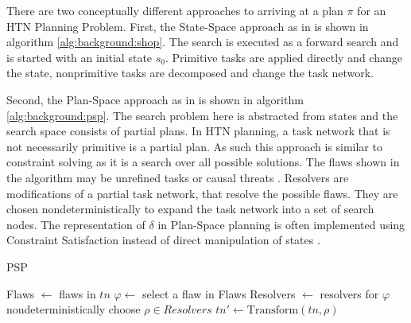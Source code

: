 There are two conceptually different approaches to arriving at a plan $\pi$ for an HTN Planning Problem. 
First, the State-Space approach as in \cite{nauSHOPSimpleHierarchical1999} is shown in algorithm \ref{alg:background:shop}.
The search is executed as a forward search and is started with an initial state $s_0$.
Primitive tasks are applied directly and change the state, nonprimitive tasks are decomposed and change the task network.

Second, the Plan-Space approach as in \citet[chap.~5]{ghallabAutomatedPlanningTheory2004} is shown in algorithm \ref{alg:background:psp}.
The search problem here is abstracted from states and the search space consists of partial plans.
In HTN planning, a task network that is not necessarily primitive is a partial plan.
As such this approach is similar to constraint solving as it is a search over all possible solutions.
The flaws shown in the algorithm may be unrefined tasks or causal threats .
Resolvers are modifications of a partial task network, that resolve the possible flaws.
They are chosen nondeterministically to expand the task network into a set of search nodes.
The representation of $\delta$ in Plan-Space planning is often implemented using Constraint Satisfaction instead of direct manipulation of states \citep{georgievskiHTNPlanningOverview2015}.

\begin{algorithm}
  \caption{PSP}
  \label{alg:background:psp}
  \KwOut{$\pi$}
  Flaws $\leftarrow$ flaws in $tn$\;
  $\varphi \leftarrow$ select a flaw in Flaws\;
  Resolvers $\leftarrow$ resolvers for $\varphi$\;
  nondeterministically choose $\rho \in Resolvers$\;
  $tn' \leftarrow \text{Transform}(tn, \rho)$\;
\end{algorithm}



